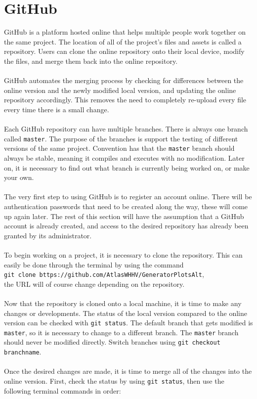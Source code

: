 \documentclass[10pt,a4paper]{report}
\begin{document}
\section*{GitHub}
GitHub is a platform hosted online that helps multiple people work together on the same project. The location of all of the project's files and assets is called a repository. Users can clone the online repository onto their local device, modify the files, and merge them back into the online repository.\\\\
GitHub automates the merging process by checking for differences between the online version and the newly modified local version, and updating the online repository accordingly. This removes the need to completely re-upload every file every time there is a small change.\\\\
Each GitHub repository can have multiple branches. There is always one branch called \verb|master|. The purpose of the branches is support the testing of different versions of the same project. Convention has that the \verb|master| branch should always be stable, meaning it compiles and executes with no modification. Later on, it is necessary to find out what branch is currently being worked on, or make your own.\\\\
The very first step to using GitHub is to register an account online. There will be authentication passwords that need to be created along the way, these will come up again later. The rest of this section will have the assumption that a GitHub account is already created, and access to the desired repository has already been granted by its administrator.\\\\
To begin working on a project, it is necessary to clone the repository. This can easily be done through the terminal by using the command\\ \verb|git clone bttps://github.com/AtlasWHHV/GeneratorPlotsAlt|,\\ the URL will of course change depending on the repository.\\\\
Now that the repository is cloned onto a local machine, it is time to make any changes or developments. The status of the local version compared to the online version can be checked with \verb|git status|. The default branch that gets modified is \verb|master|, so it is necessary to change to a different branch. The \verb|master| branch should never be modified directly. Switch branches using \verb|git checkout branchname|.\\\\
Once the desired changes are made, it is time to merge all of the changes into the online version. First, check the status by using \verb|git status|, then use the following terminal commands in order:
\end{document}
